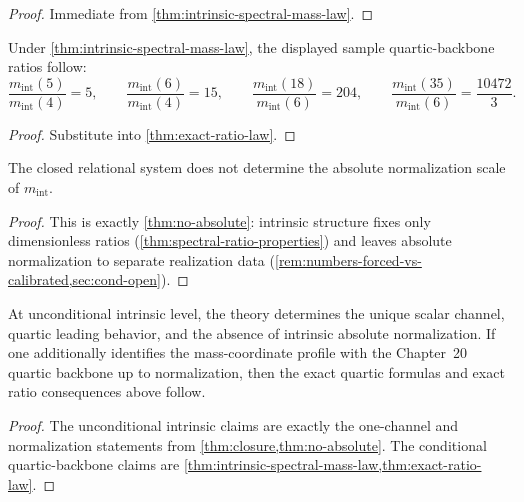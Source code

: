 \begin{proof}
Immediate from \cref{thm:intrinsic-spectral-mass-law}.
\end{proof}

\begin{corollary}
\label{cor:sample-exact-ratio-predictions}
Under \cref{thm:intrinsic-spectral-mass-law}, the displayed sample
quartic-backbone ratios follow:
\[
  \frac{m_{\mathrm{int}}(5)}{m_{\mathrm{int}}(4)}=5,
  \qquad
  \frac{m_{\mathrm{int}}(6)}{m_{\mathrm{int}}(4)}=15,
  \qquad
  \frac{m_{\mathrm{int}}(18)}{m_{\mathrm{int}}(6)}=204,
  \qquad
  \frac{m_{\mathrm{int}}(35)}{m_{\mathrm{int}}(6)}=\frac{10472}{3}.
\]
\end{corollary}

\begin{proof}
Substitute into
\cref{thm:exact-ratio-law}.
\end{proof}

\begin{theorem}
\label{thm:normalization-obstruction-final}
The closed relational system does not determine the absolute normalization
scale of \(m_{\mathrm{int}}\).
\end{theorem}

\begin{proof}
This is exactly
\cref{thm:no-absolute}:
intrinsic structure fixes only dimensionless ratios
(\cref{thm:spectral-ratio-properties}) and leaves absolute normalization to
separate realization data
(\cref{rem:numbers-forced-vs-calibrated,sec:cond-open}).
\end{proof}

\begin{corollary}
\label{cor:complete-intrinsic-prediction-content}
At unconditional intrinsic level, the theory determines the unique
scalar channel, quartic leading behavior, and the absence of intrinsic
absolute normalization.
If one additionally identifies the mass-coordinate profile with the
Chapter~20 quartic backbone up to normalization, then the exact
quartic formulas and exact ratio consequences above follow.
\end{corollary}

\begin{proof}
The unconditional intrinsic claims are exactly the one-channel and
normalization statements from
\cref{thm:closure,thm:no-absolute}.
The conditional quartic-backbone claims are
\cref{thm:intrinsic-spectral-mass-law,thm:exact-ratio-law}.
\end{proof}

